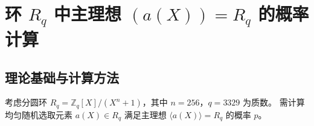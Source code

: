 \documentclass[12pt,a4paper]{article}
\numberwithin{equation}{section}
\begin{document}















\section[环 $R_q$ 中主理想 $( a(X) ) = R_q$ 的概率计算]{环 $R_q$ 中主理想 $( a(X) ) = R_q$ 的概率计算}
\subsection{理论基础与计算方法}

考虑分圆环 $R_q = \mathbb{Z}_q[X]/(X^n + 1)$，其中 $n = 256$，$q = 3329$ 为质数。
需计算均匀随机选取元素 $a(X) \in R_q$ 满足主理想 $\langle a(X) \rangle = R_q$ 的概率 $p$。
\end{document}
